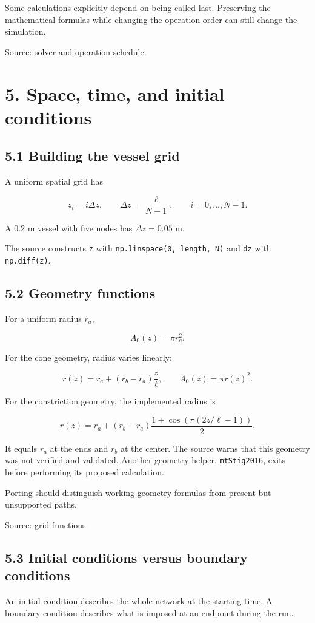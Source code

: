 \documentclass[11pt,a4paper]{article}
\begin{document}
Some calculations explicitly depend on being called last. Preserving the mathematical formulas while changing the operation order can still change the simulation.

Source: \href{/home/sadid/starfish/SolverLib/class1DflowSolver.py}{solver and operation schedule}.

\clearpage
\section{5. Space, time, and initial conditions}
\subsection{5.1 Building the vessel grid}
A uniform spatial grid has


\begingroup\small
\[
z_i=i\Delta z,\qquad
\Delta z=\frac{\ell}{N-1},\qquad i=0,\ldots,N-1.
\]
\endgroup


A 0.2 m vessel with five nodes has \(\Delta z=0.05\) m.

The source constructs \texttt{z} with \texttt{np.\allowbreak{}linspace(0, length, N)} and \texttt{dz} with \texttt{np.\allowbreak{}diff(z)}.

\subsection{5.2 Geometry functions}
For a uniform radius \(r_a\),


\begingroup\small
\[
A_0(z)=\pi r_a^2.
\]
\endgroup


For the cone geometry, radius varies linearly:


\begingroup\small
\[
r(z)=r_a+(r_b-r_a)\frac z\ell,
\qquad A_0(z)=\pi r(z)^2.
\]
\endgroup


For the constriction geometry, the implemented radius is


\begingroup\small
\[
r(z)=r_a+(r_b-r_a)
\frac{1+\cos(\pi(2z/\ell-1))}{2}.
\]
\endgroup


It equals \(r_a\) at the ends and \(r_b\) at the center. The source warns that this geometry was not verified and validated. Another geometry helper, \texttt{mtStig2016}, exits before performing its proposed calculation.

Porting should distinguish working geometry formulas from present but unsupported paths.

Source: \href{/home/sadid/starfish/NetworkLib/moduleGrids.py}{grid functions}.

\subsection{5.3 Initial conditions versus boundary conditions}
An initial condition describes the whole network at the starting time. A boundary condition describes what is imposed at an endpoint during the run.
\end{document}
